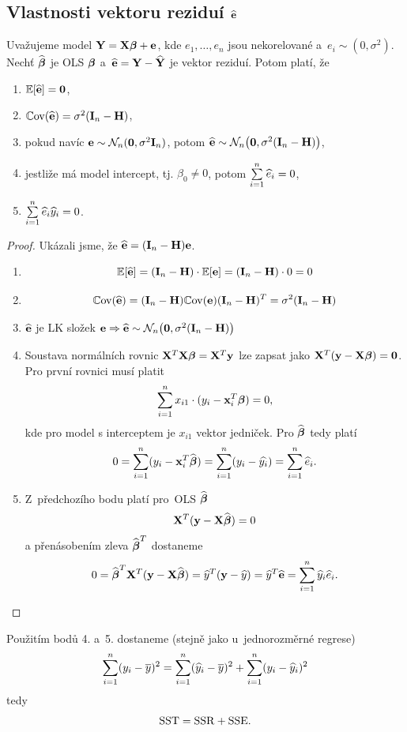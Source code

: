 \subsection{Vlastnosti vektoru reziduí $\heb$ }

\begin{theorem}
	Uvažujeme model $\Y = \X \betab + \eb$, kde $e_1,\dots, e_n$ jsou nekorelované a~$e_i \sim (0,\sigma^2)$. Nechť $\wbetab$ je OLS $\betab$ a~$\heb = \Y - \hYb$ je vektor reziduí. Potom platí, že

\begin{enumerate}
\item $\E [\heb] = \nula$,
\item $\Cov(\heb) = \sigma^2 (\In - \Hm)$,
\item pokud navíc $\eb \sim \NN_n (\nula, \sigma^2 \In)$, potom $\heb \sim \NN_n \big(\nula, \sigma^2 (\In - \Hm)\big)$,
\item jestliže má model intercept, tj. $\beta_0 \neq 0$, potom $\sumin \widehat{e}_i = 0$,
\item $\sumin \widehat{e}_i \widehat{y}_i = 0$.
\end{enumerate}		
\end{theorem}

\begin{proof}
Ukázali jsme, že $\heb = (\In - \Hm) \eb$.
\begin{enumerate}
\item $$\E [\heb] = (\In - \Hm) \cdot \E [\eb] = (\In - \Hm) \cdot 0 = 0$$
\item $$\Cov(\heb) = (\In - \Hm) \Cov(\eb) (\In - \Hm)^T = \sigma^2 (\In - \Hm)$$
\item $\heb$ je LK složek $\eb  \Rightarrow  \heb \sim \NN_n \big(\nula, \sigma^2 (\In - \Hm)\big)$
\item Soustava normálních rovnic $\X^T \X \betab = \X^T \y$ lze zapsat jako $\X^T (\y - \X \betab) = \nula$. Pro první rovnici musí platit
 $$
 \sumin x_{i1} \cdot (y_i - \x_i^T \betab) = 0,
 $$
kde pro model s interceptem je $x_{i1}$ vektor jedniček. Pro $\wbetab$ tedy platí
 $$
 0 = \sumin (y_i - \x_i^T \wbetab) = \sumin (y_i - \widehat{y_i}) = \sumin \he_i.
 $$
\item Z~předchozího bodu platí pro~OLS $\wbetab$
 $$
 \X^T (\y - \X \wbetab) = 0
 $$
a přenásobením zleva $\wbetab^T$ dostaneme
 $$
  0 = \wbetab^T \X^T (\y - \X \wbetab) = \widehat{y}^T (\y - \hy) = \hy^T \heb = \sumin \hy_i \he_i.
 $$
\end{enumerate}
\end{proof}
\begin{remark}
Použitím bodů 4. a~5. dostaneme (stejně jako u~jednorozměrné regrese)
$$
\sumin (y_i - \overline{y})^2 = \sumin (\widehat{y}_i - \overline{y})^2 + \sumin (y_i - \widehat{y}_i)^2
$$
tedy
$$
\SST = \SSR + \SSE.
$$
\end{remark}

